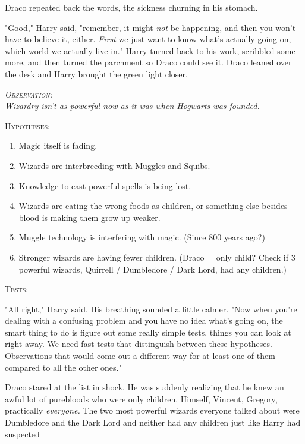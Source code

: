 Draco repeated back the words, the sickness churning in his stomach.

"Good," Harry said, "remember, it might \emph{not} be happening, and then you
won't have to believe it, either. \emph{First} we just want to know what's
actually going on, which world we actually live in." Harry turned back to his
work, scribbled some more, and then turned the parchment so Draco could see it.
Draco leaned over the desk and Harry brought the green light closer.

\begin{center}\itshape
{\scshape Observation:}\\
Wizardry isn't as powerful now as it was when Hogwarts was founded.

{\scshape Hypotheses:}
\begin{enumerate}[1.]\firmlist
\item Magic itself is fading.
\item Wizards are interbreeding with Muggles and Squibs.
\item Knowledge to cast powerful spells is being lost.
\item Wizards are eating the wrong foods as children, or something else besides
blood is making them grow up weaker.
\item Muggle technology is interfering with magic. (Since 800 years ago?)
\item Stronger wizards are having fewer children. (Draco = only child? Check if 3 
powerful wizards, Quirrell / Dumbledore / Dark Lord, had any children.)
\end{enumerate}
{\scshape Tests:}
\end{center}

"All right," Harry said. His breathing sounded a little calmer. "Now when
you're dealing with a confusing problem and you have no idea what's going on,
the smart thing to do is figure out some really simple tests, things you can
look at right away. We need fast tests that distinguish between these
hypotheses. Observations that would come out a different way for at least one
of them compared to all the other ones."

Draco stared at the list in shock. He was suddenly realizing that he knew an
awful lot of purebloods who were only children. Himself, Vincent, Gregory,
practically \emph{everyone.} The two most powerful wizards everyone talked
about were Dumbledore and the Dark Lord and neither had any children just like
Harry had suspected{\el}


